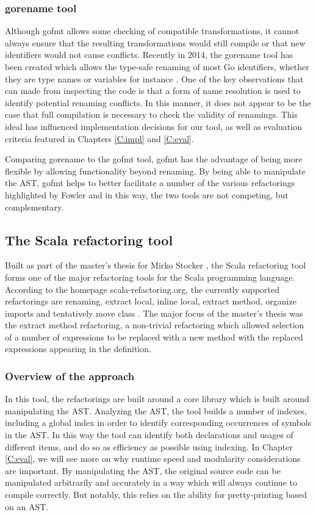 \subsubsection{gorename tool}
Although gofmt allows some checking of compatible transformations, it cannot always ensure that the resulting transformations would still compile or that new identifiers would not cause conflicts. Recently in 2014, the gorename tool has been created which allows the type-safe renaming of most Go identifiers, whether they are type names or variables for instance \cite{gorename15}. One of the key observations that can made from inspecting the code is that a form of name resolution is used to identify potential renaming conflicts. In this manner, it does not appear to be the case that full compilation is necessary to check the validity of renamings. This ideal has influenced implementation decisions for our tool, as well as evaluation criteria featured in Chapters \ref{C:impl} and \ref{C:eval}.

Comparing gorename to the gofmt tool, gofmt has the advantage of being more flexible by allowing functionality beyond renaming. By being able to manipulate the AST, gofmt helps to better facilitate a number of the various refactorings highlighted by Fowler and in this way, the two tools are not competing, but complementary.

\subsection{The Scala refactoring tool}
Built as part of the master's thesis for Mirko Stocker \cite{stocker2010scala}, the Scala refactoring tool forms one of the major refactoring tools for the Scala programming language. According to the homepage scala-refactoring.org, the currently supported refactorings are renaming, extract local, inline local, extract method, organize imports and tentatively move class \cite{scala15}. The major focus of the master's thesis was the extract method refactoring, a non-trivial refactoring which allowed selection of a number of expressions to be replaced with a new method with the replaced expressions appearing in the definition.

\subsubsection{Overview of the approach}
In this tool, the refactorings are built around a core library which is built around manipulating the AST. Analyzing the AST, the tool builds a number of indexes, including a global index in order to identify corresponding occurrences of symbols in the AST. In this way the tool can identify both declarations and usages of different items, and do so as efficiency as possible using indexing. In Chapter \ref{C:eval}, we will see more on why runtime speed and modularity considerations are important. By manipulating the AST, the original source code can be manipulated arbitrarily and accurately in a way which will always continue to compile correctly. But notably, this relies on the ability for pretty-printing based on an AST.

